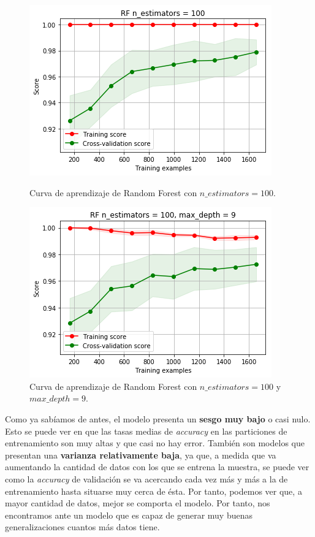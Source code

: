 \documentclass[11pt,a4paper]{article}
\begin{document}
\begin{figure}[H]
\centering
\begin{minipage}{.5\textwidth}
    \centering
    \includegraphics[scale=0.4]{img/lc-rf-n-100.png}
    \caption{Curva de aprendizaje de Random Forest con $n\_estimators=100$.}
    \label{fig:lc-rf-n-100}
\end{minipage}%
\begin{minipage}{.5\textwidth}
    \centering
    \includegraphics[scale=0.4]{img/lc-rf-n-100-d-9.png}
    \caption{Curva de aprendizaje de Random Forest con $n\_estimators=100$ y $max\_depth=9$.}
    \label{fig:lc-rf-n-100-d-9}
\end{minipage}
\end{figure}

Como ya sabíamos de antes, el modelo presenta un \textbf{sesgo muy bajo} o casi nulo. Esto se puede ver en que las tasas medias de \textit{accuracy} en las
particiones de entrenamiento son muy altas y que casi no hay error. También son modelos que presentan una \textbf{varianza relativamente baja}, ya que, a
medida que va aumentando la cantidad de datos con los que se entrena la muestra, se puede ver como la \textit{accuracy} de validación se va
acercando cada vez más y más a la de entrenamiento hasta situarse muy cerca de ésta. Por tanto, podemos ver que, a mayor cantidad de datos, mejor se
comporta el modelo. Por tanto, nos encontramos ante un modelo que es capaz de generar muy buenas generalizaciones cuantos más datos tiene.
\end{document}
